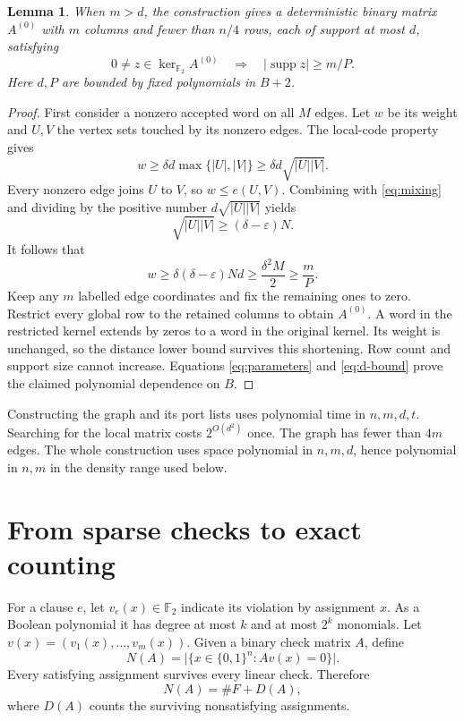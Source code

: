 \documentclass[11pt]{article}
\numberwithin{equation}{section}
\newtheorem{lemma}[theorem]{Lemma}
\theoremstyle{definition}\newtheorem{definition}[theorem]{Definition}
\theoremstyle{remark}\newtheorem{remark}[theorem]{Remark}
\DeclareMathOperator{\supp}{supp}
\newcommand{\F}{\mathbb F}
\begin{document}
\begin{lemma}\label{lem:initial-checks}
When $m>d$, the construction gives a deterministic binary matrix
$A^{(0)}$ with $m$ columns and fewer than $n/4$ rows, each of
support at most $d$, satisfying
\begin{equation}\label{eq:initial-distance}
 0\ne z\in\ker_{\F_2}A^{(0)}
       \quad\Longrightarrow\quad |\supp z|\ge m/P.
\end{equation}
Here $d,P$ are bounded by fixed polynomials in $B+2$.
\end{lemma}
\begin{proof}
First consider a nonzero accepted word on all $M$ edges. Let $w$
be its weight and $U,V$ the vertex sets touched by its nonzero
edges. The local-code property gives
\[
 w\ge\delta d\max\{|U|,|V|\}
       \ge\delta d\sqrt{|U||V|}.
\]
Every nonzero edge joins $U$ to $V$, so $w\le e(U,V)$.
Combining with \eqref{eq:mixing} and dividing by the positive number
$d\sqrt{|U||V|}$ yields
\[
 \sqrt{|U||V|}\ge(\delta-\varepsilon)N.
\]
It follows that
\[
 w\ge\delta(\delta-\varepsilon)Nd
     \ge\frac{\delta^2M}{2}\ge\frac{m}{P}.
\]
Keep any $m$ labelled edge coordinates and fix the remaining ones
to zero. Restrict every global row to the retained columns to obtain
$A^{(0)}$. A word in the restricted kernel extends by zeros to a
word in the original kernel. Its weight is unchanged, so the distance
lower bound survives this shortening. Row count and support size
cannot increase. Equations \eqref{eq:parameters} and
\eqref{eq:d-bound} prove the claimed polynomial dependence on $B$.
\end{proof}

Constructing the graph and its port lists uses polynomial time in
$n,m,d,t$. Searching for the local matrix costs $2^{O(d^2)}$ once.
The graph has fewer than $4m$ edges. The whole construction uses
space polynomial in $n,m,d$, hence polynomial in $n,m$ in the
density range used below.

\section{From sparse checks to exact counting}
\label{sec:greedy}

For a clause $e$, let $v_e(x)\in\F_2$ indicate its violation by
assignment $x$. As a Boolean polynomial it has degree at most $k$
and at most $2^k$ monomials. Let $v(x)=(v_1(x),\ldots,v_m(x))$.
Given a binary check matrix $A$, define
\[
 N(A)=\bigl|\{x\in\{0,1\}^n:Av(x)=0\}\bigr|.
\]
Every satisfying assignment survives every linear check. Therefore
\begin{equation}\label{eq:survivors}
 N(A)=\#F+D(A),
\end{equation}
where $D(A)$ counts the surviving nonsatisfying assignments.
\end{document}
